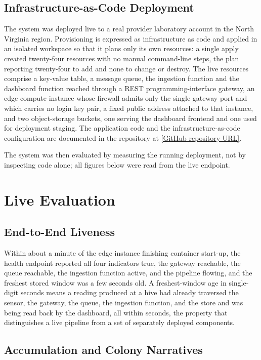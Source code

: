 \documentclass[conference]{IEEEtran}
\begin{document}
\subsection{Infrastructure-as-Code Deployment}

The system was deployed live to a real provider laboratory account in the North Virginia region. Provisioning is expressed as infrastructure as code and applied in an isolated workspace so that it plans only its own resources: a single apply created twenty-four resources with no manual command-line steps, the plan reporting twenty-four to add and none to change or destroy. The live resources comprise a key-value table, a message queue, the ingestion function and the dashboard function reached through a REST programming-interface gateway, an edge compute instance whose firewall admits only the single gateway port and which carries no login key pair, a fixed public address attached to that instance, and two object-storage buckets, one serving the dashboard frontend and one used for deployment staging. The application code and the infrastructure-as-code configuration are documented in the repository at \href{[GitHub repository URL]}{[GitHub repository URL]}.

The system was then evaluated by measuring the running deployment, not by inspecting code alone; all figures below were read from the live endpoint.

\section{Live Evaluation}

\subsection{End-to-End Liveness}

Within about a minute of the edge instance finishing container start-up, the health endpoint reported all four indicators true, the gateway reachable, the queue reachable, the ingestion function active, and the pipeline flowing, and the freshest stored window was a few seconds old. A freshest-window age in single-digit seconds means a reading produced at a hive had already traversed the sensor, the gateway, the queue, the ingestion function, and the store and was being read back by the dashboard, all within seconds, the property that distinguishes a live pipeline from a set of separately deployed components.

\subsection{Accumulation and Colony Narratives}
\end{document}
